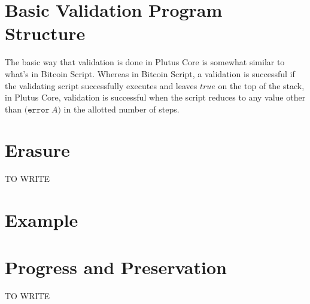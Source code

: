 \documentclass[conference]{IEEEtran}
\newcommand{\keyword}[1]{\texttt{#1}}
\newcommand{\construct}[1]{\texttt{(} #1 \texttt{)}}
\newcommand{\error}[1]{\construct{\keyword{error} ~ #1}}
\begin{document}
\section{Basic Validation Program Structure}

The basic way that validation is done in Plutus Core is somewhat similar to what's in Bitcoin Script. Whereas in Bitcoin Script, a validation is successful if the validating script successfully executes and leaves $\textit{true}$ on the top of the stack, in Plutus Core, validation is successful when the script reduces to any value other than \(\error{A}\) in the allotted number of steps.







\section{Erasure}

TO WRITE







\section{Example}






\section{Progress and Preservation}

TO WRITE













\end{document}
